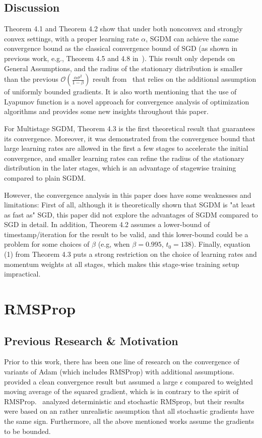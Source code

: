 \documentclass{article}
\begin{document}
\subsection{Discussion}
Theorem 4.1 and Theorem 4.2 show that under both nonconvex and strongly convex settings, with a proper learning rate $\alpha$, SGDM can achieve the same convergence bound as the classical convergence bound of SGD (as shown in previous work, e.g., Theorem 4.5 and 4.8 in~\cite{https://doi.org/10.48550/arxiv.1606.04838}). This result only depends on General Assumptions, and the radius of the stationary distribution is smaller than the previous $\mathcal{O}(\frac{\alpha\sigma^2}{1 - \beta})$ result from~\cite{https://doi.org/10.48550/arxiv.1905.03817} that relies on the additional assumption of uniformly bounded gradients. It is also worth mentioning that the use of Lyapunov function is a novel approach for convergence analysis of optimization algorithms and provides some new insights throughout this paper. 

For Multistage SGDM, Theorem 4.3 is the first theoretical result that guarantees its convergence. Moreover, it was demonstrated from the convergence bound that large learning rates are allowed in the first a few stages to accelerate the initial convergence, and smaller learning rates can refine the radius of the stationary distribution in the later stages, which is an advantage of stagewise training compared to plain SGDM.

However, the convergence analysis in this paper does have some weaknesses and limitations: First of all, although it is theoretically shown that SGDM is "at least as fast as" SGD, this paper did not explore the advantages of SGDM compared to SGD in detail. In addition, Theorem 4.2 assumes a lower-bound of timestamp/iteration for the result to be valid, and this lower-bound could be a problem for some choices of $\beta$ (e.g, when $\beta = 0.995$, $t_0 = 138$). Finally, equation (1) from Theorem 4.3 puts a strong restriction on the choice of learning rates and momentum weights at all stages, which makes this stage-wise training setup impractical.
\section{RMSProp}
\label{section6}
\setcounter{equation}{0}
\subsection{Previous Research \& Motivation}
Prior to this work, there has been one line of research on the convergence of variants of Adam (which includes RMSProp) with additional assumptions.~\cite{https://doi.org/10.48550/arxiv.2003.02395} provided a clean convergence result but assumed a large $\epsilon$ compared to  weighted moving average of the squared gradient, which is in contrary to the spirit of RMSProp.~\cite{https://doi.org/10.48550/arxiv.1807.06766} analyzed deterministic and stochastic RMSprop, but their results were based on an rather unrealistic assumption that all stochastic gradients have the same sign. Furthermore, all the above mentioned works assume the gradients to be bounded.
\end{document}
